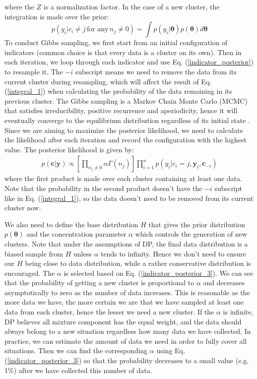 \documentclass[journal]{IEEEtran}
\begin{document}
where the $Z$ is a normalization factor. 
In the case of a new cluster, the integration is made over the prior:
\begin{equation}
p(y_i|c_i \neq j \, \text{for any} \, n_j \neq 0) = 
\int p(y_i|\bm{\theta})
p(\bm{\theta})d\bm{\theta}
\label{integral_2}
\end{equation}
To conduct Gibbs sampling, we first start from an initial configuration of indicators (common choice is that every data is a cluster on its own).
Then in each iteration, we loop through each indicator and use Eq. (\ref{indicator_posterior}) to resample it. 
The $-i$ subscript means we need to remove the data from its current cluster during resampling, which will affect the result of Eq. (\ref{integral_1}) when calculating the probability of the data remaining in its previous cluster. 
The Gibbs sampling is a Markov Chain Monte Carlo (MCMC) that satisfies irreducibility, positive recurrence and aperiodicity, hence it will eventually converge to the equilibrium distribution regardless of its initial state \cite{MCMC}. 
Since we are aiming to maximize the posterior likelihood, we need to calculate the likelihood after each iteration and record the configuration with the highest value.
The posterior likelihood is given by:
\begin{equation}
\begin{gathered}
p(\bm{c}|\bm{y}) \propto 
\left[\prod_{n_j \neq 0} \alpha \Gamma(n_j)\right]
\prod_{i=1}^n p(y_i|c_i = j, \bm{y}_i, \bm{c}_{-i})
\end{gathered}
\label{posterior_likelihood}
\end{equation}
where the first product is made over each cluster containing at least one data. 
Note that the probability in the second product doesn't have the $-i$ subscript like in Eq. (\ref{integral_1}), so the data doesn't need to be removed from its current cluster now.


We also need to define the base distribution $H$ that gives the prior distribution $p(\bm{\theta})$ and the concentration parameter $\alpha$ which controls the generation of new clusters.
Note that under the assumptions of DP, the final data distribution is a biased sample from $H$ unless $\alpha$ tends to infinity. Hence we don't need to ensure our $H$ being close to data distribution, while a rather conservative distribution is encouraged.
The $\alpha$ is selected based on Eq. (\ref{indicator_posterior_3}).
We can see that the probability of getting a new cluster is proportional to $\alpha$ and decreases asymptotically to zero as the number of data increases.
This is reasonable as the more data we have, the more certain we are that we have sampled at least one data from each cluster, hence the lesser we need a new cluster. 
If the $\alpha$ is infinite, DP believes all mixture component has the equal weight, and the data should always belong to a new situation regardless how many data we have collected.
In practice, we can estimate the amount of data we need in order to fully cover all situations. Then we can find the corresponding $\alpha$ using Eq. (\ref{indicator_posterior_3}) so that the probability decreases to a small value (e.g. 1\%) after we have collected this number of data.
\end{document}
